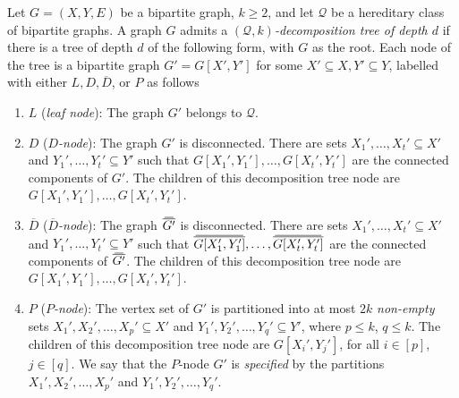 \documentclass{theoretics}
\newcommand{\cQ}{\ensuremath{\mathcal{Q}}}
\newcommand\doverline[1]{%
  \setbox0=\hbox{$\!\overline{#1}\!$}%
  \ht0=\dimexpr\ht0-.2ex\relax%
  \,\overline{\copy0}\,%
}
\newcommand{\bc}[1]{\doverline{#1}} %
\begin{document}
\begin{definition}[$(\cQ,k)$-decomposition tree]
\label{Qkd decomposition tree}
Let $G=(X,Y,E)$ be a bipartite graph, $k \geq 2$, and let $\cQ$ be a hereditary class of bipartite
graphs.  A graph $G$ admits a \emph{$(\cQ,k)$-decomposition tree of depth $d$} if there is a tree of
depth $d$ of the following form, with $G$ as the root. Each node of the tree is a bipartite graph
$G' = G[X',Y']$ for some $X' \subseteq X, Y' \subseteq Y$, labelled with either $L, D, \overline D$,
or $P$ as follows
	
	\begin{enumerate}[label=\textup{(\arabic*)}]
		\item $L$ (\emph{leaf node}): The graph $G'$ belongs to $\cQ$.
		
		\item $D$ (\emph{$D$-node}): The graph $G'$ is disconnected. 
		There are sets $X_1', \dotsc, X_t' \subseteq X'$ and $Y_1', \dotsc, Y_t' \subseteq Y'$ 
		such that $G[X_1',Y_1'], \dotsc, G[X_t',Y_t']$ are the connected components of $G'$. 
		The children of this decomposition tree node are $G[X_1',Y_1'], \dotsc, G[X_t',Y_t']$.
		
		\item $\overline D$ (\emph{$\overline{D}$-node}): The graph $\bc{G'}$ is disconnected. 
		There are sets $X_1', \dotsc, X_t' \subseteq X'$ and $Y_1', \dotsc, Y_t' \subseteq Y'$ 
		such that $\bc{G[X_1',Y_1']}, \dotsc,  \bc{G[X_t',Y_t']}$ 
		are the connected components of $\bc{G'}$. 
		The children of this decomposition tree node are $G[X_1',Y_1'], \dotsc, G[X_t',Y_t']$.
		
		\item $P$ (\emph{$P$-node}):
		The vertex set of $G'$ is partitioned into at most $2k$ \emph{non-empty} sets $X_1', X_2', \ldots, X_p' \subseteq X'$ and $Y_1', Y_2', \ldots, Y_q' \subseteq Y'$, 
		where $p \leq k$, $q \leq k$. The children of this decomposition tree node are $G[X_i', Y_j']$, for all $i \in[p]$,  $j \in [q]$.
		We say that the $P$-node $G'$ is \emph{specified} by the partitions $X_1', X_2', \ldots, X_p'$ and 
		$Y_1', Y_2', \ldots, Y_q'$.
	\end{enumerate}
\end{definition}
\end{document}
